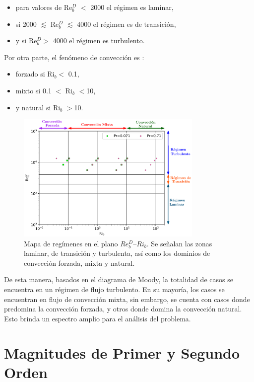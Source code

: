 \begin{itemize}
	\item para valores de Re$^D_b$ $<$ 2000 el régimen es laminar,
	\item si 2000 $\lesssim$ Re$^D_b$ $\lesssim$ 4000 el régimen es de transición,
	\item y si Re$^D_b>$ 4000 el régimen es turbulento.
\end{itemize}
Por otra parte, el fenómeno de convección es \cite{incropera,cengelheat}:

\begin{itemize}
	\item forzado si Ri$_b<$ 0.1,
	\item mixto si 0.1 $<$ Ri$_b$ $<$10,
	\item y natural si Ri$_b$ $>$10.
\end{itemize}

\begin{figure}[H]
  \centering
    \includegraphics[width=0.8\textwidth]{figures/cap5/map.eps}
  \caption{Mapa de regímenes en el plano $Re^D_b$–$Ri_b$. Se señalan las zonas laminar, de transición y turbulenta, así como los dominios de convección forzada, mixta y natural.}
  \label{fig:map_flow_regime}
\end{figure}

De esta manera, basados en el diagrama de Moody, la totalidad de casos se encuentra en un régimen de flujo turbulento. En su mayoría, los casos se encuentran en flujo de convección mixta, sin embargo, se cuenta con casos donde predomina la convección forzada, y otros donde domina la convección natural. Esto brinda un espectro amplio para el análisis del problema.

\section{Magnitudes de Primer y Segundo Orden}


